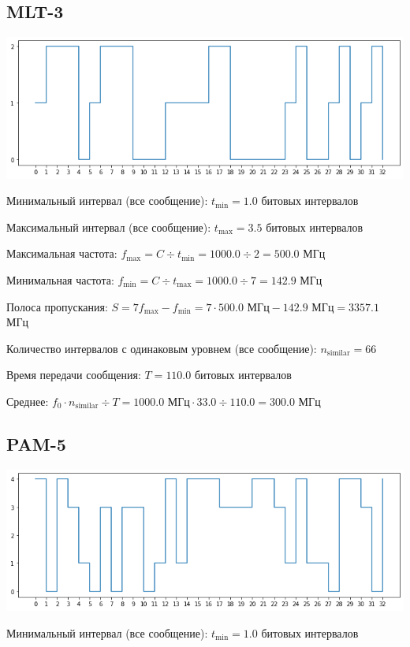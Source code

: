 \subsection{MLT-3}
\includegraphics[width=\textwidth]{2mlt3}

Минимальный интервал (все сообщение): $t_\mathrm{min}=1.0$ битовых интервалов

Максимальный интервал (все сообщение): $t_\mathrm{max}=3.5$ битовых интервалов

Максимальная частота: $f_\mathrm{max}=C\div t_\mathrm{min}=1000.0\div 2=500.0$ МГц

Минимальная частота: $f_\mathrm{min}=C\div t_\mathrm{max}=1000.0\div 7=142.9$ МГц

Полоса пропускания: $S=7f_\mathrm{max}-f_\mathrm{min} = 7\cdot 500.0\text{ МГц}-142.9\text{ МГц}=3357.1$ МГц

Количество интервалов с одинаковым уровнем (все сообщение): $n_\mathrm{similar}=66$

Время передачи сообщения: $T=110.0$ битовых интервалов

Среднее: $f_0\cdot n_\mathrm{similar}\div T=1000.0\text{ МГц}\cdot 33.0\div 110.0=300.0$ МГц

\subsection{PAM-5}
\includegraphics[width=\textwidth]{2pam5}

Минимальный интервал (все сообщение): $t_\mathrm{min}=1.0$ битовых интервалов

